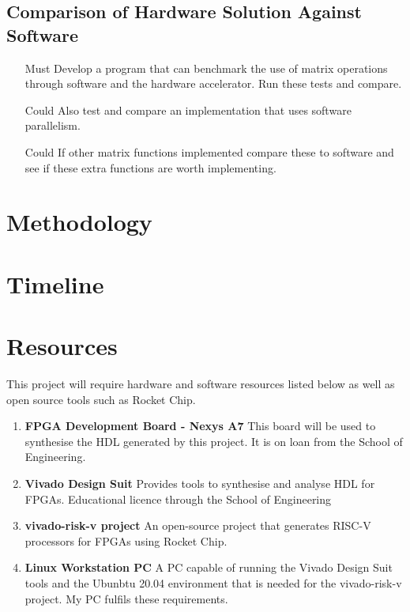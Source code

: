 \documentclass[a4paper,fleqn,12pt]{article}
\begin{document}
	\subsection{Comparison of Hardware Solution Against Software}
	\begin{enumerate}
		\item [Must] Develop a program that can benchmark the use of matrix operations through software and the hardware accelerator. Run these tests and compare.
		\item [Could] Also test and compare an implementation that uses software parallelism.
		\item [Could] If other matrix functions implemented compare these to software and see if these extra functions are worth implementing.
	\end{enumerate}
	
	\section{Methodology}
	
	\section{Timeline}
	
	\section{Resources}
	This project will require hardware and software resources listed below as well as open source tools such as Rocket Chip.
	\begin{enumerate}
		\item \textbf{FPGA Development Board - Nexys A7} \newline
		This board will be used to synthesise the HDL generated by this project. It is on loan from the School of Engineering.
		\item \textbf{Vivado Design Suit} \newline
		Provides tools to synthesise and analyse HDL for FPGAs. Educational licence through the School of Engineering
		\item \textbf{vivado-risk-v project} \citep{vivado-risk-v} \newline
		An open-source project that generates RISC-V processors for FPGAs using Rocket Chip.
		\item \textbf{Linux Workstation PC} \newline
		A PC capable of running the Vivado Design Suit tools and the Ubunbtu 20.04 environment that is needed for the vivado-risk-v project. My PC fulfils these requirements.
	\end{enumerate}
	
\end{document}

